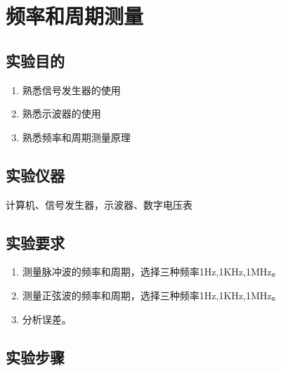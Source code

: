 \documentclass[12pt]{article}
\begin{document}
\setcounter{page}{1}
\section{频率和周期测量}
\setcounter{equation}{0}
\setcounter{table}{0}
\setcounter{figure}{0}
\subsection{实验目的}
\begin{enumerate}
  \item 熟悉信号发生器的使用
\item 熟悉示波器的使用
\item 熟悉频率和周期测量原理
\end{enumerate}
\subsection{实验仪器}
计算机、信号发生器，示波器、数字电压表
\subsection{实验要求}
\begin{enumerate}
  \item 测量脉冲波的频率和周期，选择三种频率1Hz,1KHz,1MHz。
\item 测量正弦波的频率和周期，选择三种频率1Hz,1KHz,1MHz。
\item 分析误差。
\end{enumerate}
\subsection{实验步骤}
\end{document}
